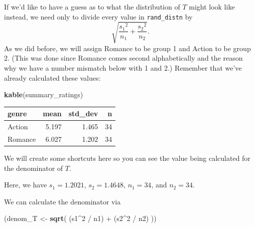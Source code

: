 \documentclass[]{tufte-book}
\newenvironment{Shaded}{\begin{snugshade}}{\end{snugshade}}
\newcommand{\KeywordTok}[1]{\textcolor[rgb]{0.13,0.29,0.53}{\textbf{{#1}}}}
\newcommand{\DecValTok}[1]{\textcolor[rgb]{0.00,0.00,0.81}{{#1}}}
\newcommand{\StringTok}[1]{\textcolor[rgb]{0.31,0.60,0.02}{{#1}}}
\newcommand{\NormalTok}[1]{{#1}}
\theoremstyle{definition}
\theoremstyle{definition}
\theoremstyle{remark}
\begin{document}
If we'd like to have a guess as to what the distribution of \(T\) might
look like instead, we need only to divide every value in
\texttt{rand\_distn} by
\[\sqrt{\dfrac{{s_1}^2}{n_1} + \dfrac{{s_2}^2}{n_2}}.\] As we did
before, we will assign Romance to be group 1 and Action to be group 2.
(This was done since Romance comes second alphabetically and the reason
why we have a number mismatch below with 1 and 2.) Remember that we've
already calculated these values:

\begin{Shaded}
\begin{Highlighting}[]
\KeywordTok{kable}\NormalTok{(summary_ratings)}
\end{Highlighting}
\end{Shaded}

\begin{tabular}{l|r|r|r}
\hline
genre & mean & std\_dev & n\\
\hline
Action & 5.197 & 1.465 & 34\\
\hline
Romance & 6.027 & 1.202 & 34\\
\hline
\end{tabular}

We will create some shortcuts here so you can see the value being
calculated for the denominator of \(T\).

\begin{Shaded}
\end{Shaded}

Here, we have \(s_1 = 1.2021\), \(s_2 = 1.4648\), \(n_1 = 34\), and
\(n_2 = 34\).

We can calculate the denominator via

\begin{Shaded}
\begin{Highlighting}[]
\NormalTok{(denom_T <-}\StringTok{ }\KeywordTok{sqrt}\NormalTok{( (s1^}\DecValTok{2} \NormalTok{/}\StringTok{ }\NormalTok{n1) +}\StringTok{ }\NormalTok{(s2^}\DecValTok{2} \NormalTok{/}\StringTok{ }\NormalTok{n2) ))}
\end{Highlighting}
\end{Shaded}
\end{document}

